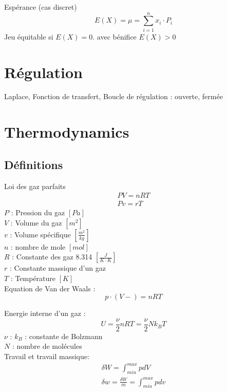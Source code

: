 	Espérance (cas discret)
	\begin{equation}
	E(X)=\mu=\sum_{i=1}^{n}x_i\cdot P_i
	\end{equation}
	Jeu équitable si $E(X)=0$. avec bénifice $E(X)>0$
	
	\newpage
	\section{Régulation}
	
	Laplace, Fonction de transfert, Boucle de régulation : ouverte, fermée
	
	\newpage
	\section{Thermodynamics}
	\subsection{Définitions}
	Loi des gaz parfaits
	\begin{eqnarray}
	PV=nRT\\
	Pv=rT
	\end{eqnarray}
	$P$ : Pression du gaz $[Pa]$\\
	$V$ : Volume du gaz $[m^2]$\\
	$v$ : Volume spécifique $[\frac{m^2}{kg}]$\\
	$n$ : nombre de mole $[mol]$\\
	$R$ : Constante des gaz 8.314 $[\frac{J}{K \cdot K}]$\\
	$r$ : Constante massique d'un gaz \\
	$T$ : Température $[K]$\\
	
	
	Equation de Van der Waals :
	\begin{equation}
	p \cdot (V-)=n R T
	\end{equation}
	
	Energie interne d'un gaz :
	\begin{equation}
	U=\frac{\nu}{2} nRT=\frac{\nu}{2} N k_B T
	\end{equation}
	$\nu$ : 
	$k_B$ : constante de Bolzmann\\
	$N$ :  nombre de molécules\\
	
	Travail et travail massique:
	\begin{eqnarray}
	\delta W=\int_{min}^{max} p dV\\
	\delta w=\frac{\delta W}{m} =\int_{min}^{max} p dv\\
	\end{eqnarray}
	
